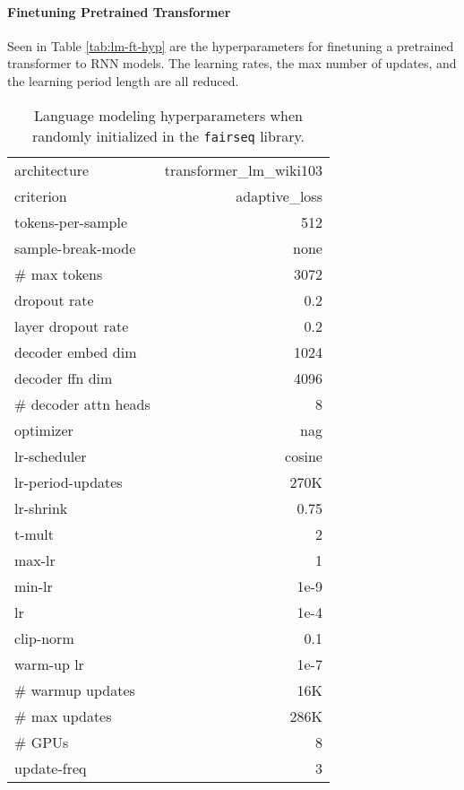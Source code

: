 \documentclass[11pt,a4paper]{article}
\begin{document}
\paragraph{Finetuning Pretrained Transformer}
Seen in Table \ref{tab:lm-ft-hyp} are the hyperparameters for finetuning a pretrained transformer to RNN models. The learning rates, the max number of updates, and the learning period length are all reduced.
\begin{table}[h]
\small
\centering
\begin{tabular}{ |l r|}
\hline
architecture & transformer\_lm\_wiki103\\
criterion & adaptive\_loss \\
tokens-per-sample & 512 \\
sample-break-mode & none \\
\# max tokens & 3072\\
dropout rate & 0.2\\
layer dropout rate & 0.2\\
decoder embed dim  & 1024\\
decoder ffn dim  & 4096\\
\# decoder attn heads & 8\\
optimizer &  nag \\
lr-scheduler &  cosine \\
lr-period-updates &  270K \\
lr-shrink & 0.75 \\
t-mult & 2 \\
max-lr & 1 \\
min-lr & 1e-9 \\
lr &  1e-4 \\
clip-norm & 0.1\\
warm-up lr & 1e-7 \\
\# warmup updates & 16K \\
\# max updates &  286K \\
\# GPUs & 8 \\
update-freq & 3\\
\hline
\end{tabular}
\caption{Language modeling hyperparameters when randomly initialized in the \texttt{fairseq} library.}
\label{tab:lm-hyp}
\end{table}
\end{document}
